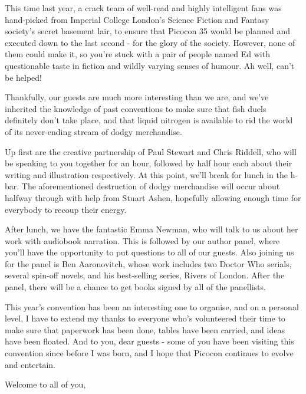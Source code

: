 This time last year, a crack team of well-read and highly intelligent fans was hand-picked from Imperial College London's Science Fiction and Fantasy society's secret basement lair, to ensure that Picocon 35 would be planned and executed down to the last second - for the glory of the society. However, none of them could make it, so you're stuck with a pair of people named Ed with questionable taste in fiction and wildly varying senses of humour. Ah well, can't be helped!

Thankfully, our guests are much more interesting than we are, and we've inherited the knowledge of past conventions to make sure that fish duels definitely don't take place, and that liquid nitrogen is available to rid the world of its never-ending stream of dodgy merchandise.

Up first are the creative partnership of Paul Stewart and Chris Riddell, who will be speaking to you together for an hour, followed by half hour each about their writing and illustration respectively. At this point, we'll break for lunch in the h-bar. The aforementioned destruction of dodgy merchandise will occur about halfway through with help from Stuart Ashen, hopefully allowing enough time for everybody to recoup their energy. 

After lunch, we have the fantastic Emma Newman, who will talk to us about her work with audiobook narration. This is followed by our author panel, where you'll have the opportunity to put questions to all of our guests. Also joining us for the panel is Ben Aaronovitch, whose work includes two Doctor Who serials, several spin-off novels, and his best-selling series, Rivers of London. After the panel, there will be a chance to get books signed by all of the panellists.

This year's convention has been an interesting one to organise, and on a personal level, I have to extend my thanks to everyone who's volunteered their time to make sure that paperwork has been done, tables have been carried, and ideas have been floated. And to you, dear guests - some of you have been visiting this convention since before I was born, and I hope that Picocon continues to evolve and entertain.

Welcome to all of you,